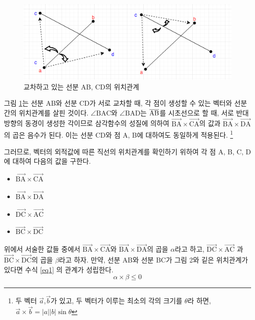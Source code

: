 \documentclass[10pt,a4paper]{article}
\begin{document}
\begin{spacing}{1.6}
  \begin{figure}
	\centering
	\includegraphics[scale=1]{Fig2.png}
	\caption{교차하고 있는 선분 AB, CD의 위치관계 } 
	\label{fig2}
  \end{figure}

    그림 \ref{fig2}는 선분 AB와 선분 CD가 서로 교차할 때, 각 점이 생성할 수 있는 벡터와 선분간의 위치관계를 살핀 것이다. $\angle{\mathrm{BAC}}$와 $\angle{\mathrm{BAD}}$는 $\overline{\mathrm{\mathrm{AB}}}$를 시초선으로 할 때, 서로 반대 방향의 동경이 생성한 각이므로 삼각함수의 성질에 의하여 $\vec{\mathrm{BA}} \times \vec{\mathrm{CA}}$의 값과 $\vec{\mathrm{BA}} \times \vec{\mathrm{DA}}$의 곱은 음수가 된다. 이는 선분 CD와 점 A, B에 대하여도 동일하게 적용된다. \footnote{두 벡터 $\vec{a}$,$\vec{b}$가 있고, 두 벡터가 이루는 최소의 각의 크기를 $\theta$라 하면, $\vec{a} \times \vec{b} = |a||b|\sin{\theta}$}
    
    그러므로, 벡터의 외적값에 따른 직선의 위치관계를 확인하기 위하여 각 점 A, B, C, D에 대하여 다음의 값을 구한다. 
    \begin{itemize}
    	\item $\vec{\mathrm{BA}} \times \vec{\mathrm{CA}}$
    	\item $\vec{\mathrm{BA}} \times \vec{\mathrm{DA}}$
    	\item $\vec{\mathrm{DC}} \times \vec{\mathrm{AC}}$
    	\item $\vec{\mathrm{BC}} \times \vec{\mathrm{DC}}$
    \end{itemize}

    위에서 서술한 값들 중에서 $\vec{\mathrm{BA}} \times \vec{\mathrm{CA}}$와 $\vec{\mathrm{BA}} \times \vec{\mathrm{DA}}$의 곱을 $\alpha$라고 하고, $\vec{\mathrm{DC}} \times \vec{\mathrm{AC}}$ 과 $\vec{\mathrm{BC}} \times \vec{\mathrm{DC}}$의 곱을 $\beta$라고 하자. 만약, 선분 AB와 선분 BC가 그림 2와 깉은 위치관계가 있다면 수식 \ref{eq1} 의 관계가 성립한다. 
    \begin{equation}
    \alpha \times \beta \leq 0
    \label{eq1}
    \end{equation}
    

\end{spacing}
\end{document}
